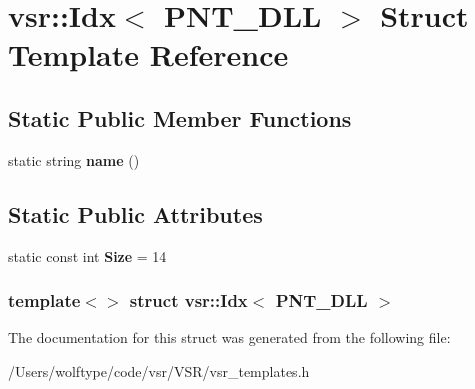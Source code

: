 \hypertarget{structvsr_1_1_idx_3_01_p_n_t___d_l_l_01_4}{\section{vsr\-:\-:Idx$<$ P\-N\-T\-\_\-\-D\-L\-L $>$ Struct Template Reference}
\label{structvsr_1_1_idx_3_01_p_n_t___d_l_l_01_4}
}
\subsection*{Static Public Member Functions}
\begin{DoxyCompactItemize}
\item 
\hypertarget{structvsr_1_1_idx_3_01_p_n_t___d_l_l_01_4_a108a79cd10fc303d2ef0745b9cfb157a}{static string {\bfseries name} ()}\label{structvsr_1_1_idx_3_01_p_n_t___d_l_l_01_4_a108a79cd10fc303d2ef0745b9cfb157a}

\end{DoxyCompactItemize}
\subsection*{Static Public Attributes}
\begin{DoxyCompactItemize}
\item 
\hypertarget{structvsr_1_1_idx_3_01_p_n_t___d_l_l_01_4_a6256bf7ebd4867e501b66e9ab1fde57a}{static const int {\bfseries Size} = 14}\label{structvsr_1_1_idx_3_01_p_n_t___d_l_l_01_4_a6256bf7ebd4867e501b66e9ab1fde57a}

\end{DoxyCompactItemize}
\subsubsection*{template$<$$>$ struct vsr\-::\-Idx$<$ P\-N\-T\-\_\-\-D\-L\-L $>$}



The documentation for this struct was generated from the following file\-:\begin{DoxyCompactItemize}
\item 
/\-Users/wolftype/code/vsr/\-V\-S\-R/vsr\-\_\-templates.\-h\end{DoxyCompactItemize}
